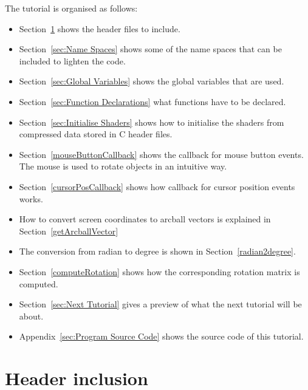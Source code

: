 \documentclass[11pt,oneside,a4paper,final]{article}
\begin{document}
The tutorial is organised as follows:
\begin{itemize}
 \item Section~\ref{sec:Header inclusion} shows the header files to include. 

 \item Section~\ref{sec:Name Spaces} shows some of the name spaces that can be 
	included to lighten the code. 

 \item Section~\ref{sec:Global Variables} shows the global variables that are 
	used. 

 \item Section~\ref{sec:Function Declarations} what functions have to 
	be declared. 

 \item Section~\ref{sec:Initialise Shaders} shows how to initialise the shaders from compressed data stored in C header files. 

 \item Section~\ref{mouseButtonCallback} shows the callback for mouse button events. 
 The mouse is used to rotate objects in an intuitive way. 

 \item Section~\ref{cursorPosCallback} shows how callback for cursor position events works. 

 \item How to convert screen coordinates to arcball vectors is explained in Section~\ref{getArcballVector} 

 \item The conversion from radian to degree is shown in Section~\ref{radian2degree}.

 \item Section~\ref{computeRotation} shows how the corresponding rotation matrix is computed. 
 
 \item Section~\ref{sec:Next Tutorial} gives a preview of what the next 
  tutorial will be about.
 
 \item Appendix~\ref{sec:Program Source Code} shows the source code of this 
	tutorial. 
		
\end{itemize}


\section{Header inclusion}
\label{sec:Header inclusion}
\end{document}
